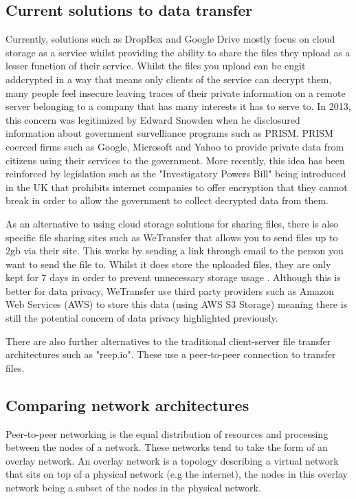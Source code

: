 \documentclass[]{report}
\begin{document}
		\subsection*{Current solutions to data transfer}
			Currently, solutions such as DropBox and Google Drive mostly focus on cloud storage as a service whilst providing the ability to share the files they upload as a lesser function of their service. Whilst the files you upload can be engit addcrypted in a way that means only clients of the service can decrypt them, many people feel insecure leaving traces of their private information on a remote server belonging to a company that has many interests it has to serve to. In 2013, this concern was legitimized by Edward Snowden when he disclosured information about government survelliance programs such as PRISM. PRISM coerced firms such as Google, Microsoft and Yahoo to provide private data from citizens using their services to the government. \cite{PRISM}  More recently, this idea has been reinforced by legislation such as the "Investigatory Powers Bill"  being introduced in the UK that prohibits internet companies to offer encryption that they cannot break in order to allow the government to collect decrypted data from them. 
			
			As an alternative to using cloud storage solutions for sharing files, there is also specific file sharing sites such as WeTransfer that allows you to send files up to 2gb via their site. This works by sending a link through email to the person you want to send the file to. Whilst it does store the uploaded files, they are only kept for 7 days in order to prevent unnecessary storage usage \cite{WeTransfer Storage Time}. Although this is better for data privacy, WeTransfer use third party providers such as Amazon Web Services (AWS) to store this data (using AWS S3 Storage) \cite{WeTransfer AWS Case Study} meaning there is still the potential concern of data privacy highlighted previously.
			
			There are also further alternatives to the traditional client-server file transfer architectures such as "reep.io". These use a peer-to-peer connection to transfer files.
			
		\subsection*{Comparing network architectures}	
			Peer-to-peer networking is the equal distribution of resources and processing between the nodes of a network. These networks tend to take the form of an overlay network. An overlay network is a topology describing a virtual network that sits on top of a physical network (e.g the internet), the nodes in this overlay network being a subset of the nodes in the physical network. 
			
\end{document}
